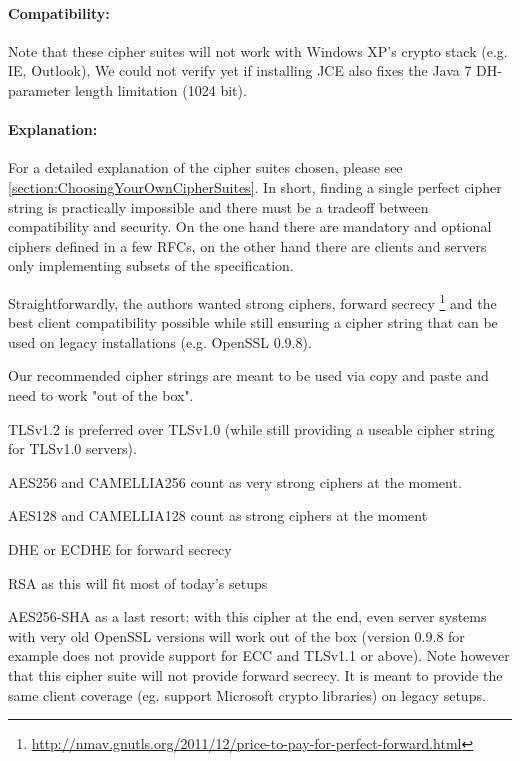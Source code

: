 \paragraph*{Compatibility: }

Note that these cipher suites will not work with Windows XP's crypto stack (e.g. IE, Outlook), 
We could not verify yet if installing JCE also fixes the Java 7
DH-parameter length limitation (1024 bit). 

\paragraph*{Explanation: }

For a detailed explanation of the cipher suites chosen, please see
\ref{section:ChoosingYourOwnCipherSuites}. In short, finding a single perfect cipher
string is practically impossible and there must be a tradeoff between compatibility and security. 
On the one hand there are mandatory and optional ciphers defined in a few RFCs, 
on the other hand there are clients and servers only implementing subsets of the 
specification.

Straightforwardly, the authors wanted strong ciphers, forward secrecy
\footnote{\url{http://nmav.gnutls.org/2011/12/price-to-pay-for-perfect-forward.html}}
and the best client compatibility possible while still ensuring a cipher string that can be
used on legacy installations (e.g. OpenSSL 0.9.8). 

Our recommended cipher strings are meant to be used via copy and paste and need to work
"out of the box".

\begin{itemize*}
  \item TLSv1.2 is preferred over TLSv1.0 (while still providing a useable cipher
      string for TLSv1.0 servers).
  \item AES256 and CAMELLIA256 count as very strong ciphers at the moment.
  \item AES128 and CAMELLIA128 count as strong ciphers at the moment
  \item DHE or ECDHE for forward secrecy
  \item RSA as this will fit most of today's setups
  \item AES256-SHA as a last resort: with this cipher at the end, even server
      systems with very old OpenSSL versions will work out of the box (version 0.9.8 for example does not
      provide support for ECC and TLSv1.1 or above). \newline
      Note however that this cipher suite will not provide forward secrecy. It
      is meant to provide the same client coverage (eg. support Microsoft crypto
      libraries) on legacy setups.
\end{itemize*}
